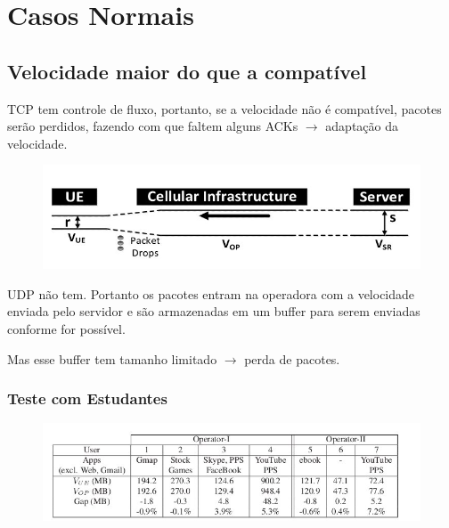 \documentclass[brazil]{beamer}
\begin{document}
\section{Casos Normais}


\subsection{Velocidade maior do que a compatível}

\begin{frame}[fragile]
    TCP tem controle de fluxo, portanto, se a velocidade não é compatível, pacotes serão perdidos, fazendo com que faltem alguns ACKs $\rightarrow$ adaptação da velocidade.
    
    \begin{figure}
    \begin{center}
        \includegraphics[scale=0.3]{images/packetLoss.jpg}
    \end{center}
    \end{figure}
\end{frame}

\begin{frame}[fragile]
    UDP não tem. Portanto os pacotes entram na operadora com a velocidade enviada pelo servidor e são armazenadas em um buffer para serem enviadas conforme for possível. 

    \vspace{0.3cm}
    Mas esse buffer tem tamanho limitado $\rightarrow$ perda de pacotes.
\end{frame}

\begin{frame}[fragile]
    \frametitle{Teste com Estudantes}
    \begin{figure}
    \begin{center}
        \includegraphics[scale=0.3]{images/seteEstudantes.jpg}
    \end{center}
    \end{figure}
\end{frame}
\end{document}
